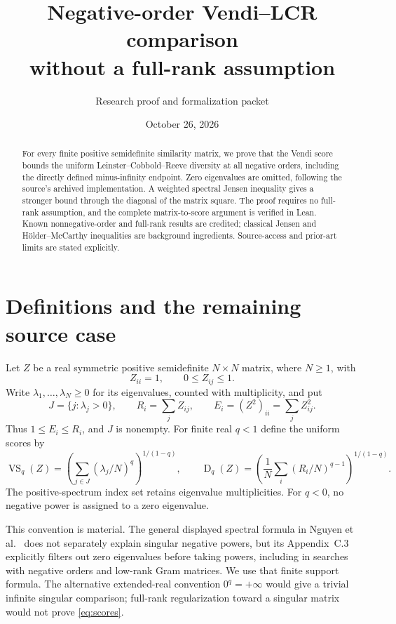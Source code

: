 \documentclass[11pt]{article}
\title{Negative-order Vendi--LCR comparison\\without a full-rank assumption}
\author{Research proof and formalization packet}
\date{October 26, 2026}
\newcommand{\VS}{\operatorname{VS}}
\newcommand{\LCR}{\operatorname{D}}
\begin{document}
\maketitle
\begin{abstract}
For every finite positive semidefinite similarity matrix, we prove that
the Vendi score bounds the uniform Leinster--Cobbold--Reeve diversity at
all negative orders, including the directly defined minus-infinity
endpoint. Zero eigenvalues are omitted, following the source's archived
implementation. A weighted spectral Jensen inequality gives a stronger
bound through the diagonal of the matrix square. The proof requires no
full-rank assumption, and the complete matrix-to-score argument is
verified in Lean. Known nonnegative-order and full-rank results are
credited; classical Jensen and H\"older--McCarthy inequalities are
background ingredients. Source-access and prior-art limits are stated
explicitly.
\end{abstract}

\section{Definitions and the remaining source case}
Let $Z$ be a real symmetric positive semidefinite $N\times N$ matrix,
where $N\geq1$, with
\[
 Z_{ii}=1,\qquad 0\leq Z_{ij}\leq1.
\]
Write $\lambda_1,\ldots,\lambda_N\geq0$ for its eigenvalues, counted
with multiplicity, and put
\[
 J=\{j:\lambda_j>0\},\qquad R_i=\sum_j Z_{ij},\qquad
 E_i=(Z^2)_{ii}=\sum_j Z_{ij}^2.
\]
Thus $1\leq E_i\leq R_i$, and $J$ is nonempty. For finite real $q<1$
define the uniform scores by
\begin{equation}\label{eq:scores}
 \VS_q(Z)=\left(\sum_{j\in J}(\lambda_j/N)^q\right)^{1/(1-q)},
 \qquad
 \LCR_q(Z)=\left(\frac1N\sum_i(R_i/N)^{q-1}\right)^{1/(1-q)}.
\end{equation}
The positive-spectrum index set retains eigenvalue multiplicities.
For $q<0$, no negative power is assigned to a zero eigenvalue.

This convention is material. The general displayed spectral formula in
Nguyen et al.\ \cite{NguyenPreprint} does not separately explain singular
negative powers, but its Appendix~C.3 explicitly filters out zero
eigenvalues before taking powers, including in searches with negative
orders and low-rank Gram matrices. We use that finite support formula.
The alternative extended-real convention $0^q=+\infty$ would give a
trivial infinite singular comparison; full-rank regularization toward
a singular matrix would not prove \eqref{eq:scores}.
\end{document}
